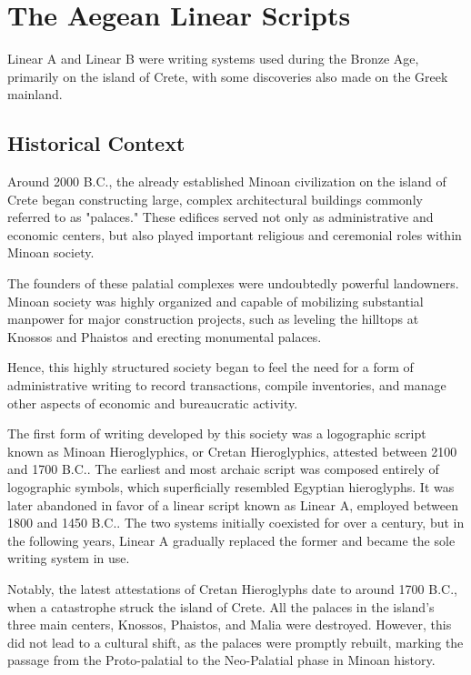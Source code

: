 \chapter{The Aegean Linear Scripts}
Linear A and Linear B were writing systems used during the Bronze Age, primarily on the island of Crete, with some discoveries also made on the Greek mainland.

\section{Historical Context}
Around 2000 B.C., the already established Minoan civilization on the island of Crete began constructing large, complex architectural buildings commonly referred to as "palaces."
These edifices served not only as administrative and economic centers, but also played important religious and ceremonial roles within Minoan society.

The founders of these palatial complexes were undoubtedly powerful landowners.
Minoan society was highly organized and capable of mobilizing substantial manpower for major construction projects, such as leveling the hilltops at Knossos and Phaistos and erecting monumental palaces. \cite{alexiou-ch2}

Hence, this highly structured society began to feel the need for a form of administrative writing to record transactions, compile inventories, and manage other aspects of economic and bureaucratic activity.

The first form of writing developed by this society was a logographic script known as Minoan Hieroglyphics, or Cretan Hieroglyphics, attested between 2100 and 1700 B.C..
The earliest and most archaic script was composed entirely of logographic symbols, which superficially resembled Egyptian hieroglyphs.
It was later abandoned in favor of a linear script known as Linear A, employed between 1800 and 1450 B.C..
The two systems initially coexisted for over a century, but in the following years, Linear A gradually replaced the former and became the sole writing system in use. \cite{salg-ch1}

Notably, the latest attestations of Cretan Hieroglyphs date to around 1700 B.C., when a catastrophe struck the island of Crete.
All the palaces in the island’s three main centers, Knossos, Phaistos, and Malia were destroyed.
However, this did not lead to a cultural shift, as the palaces were promptly rebuilt, marking the passage from the Proto-palatial to the Neo-Palatial phase in Minoan history. \cite{alexiou-ch3}

